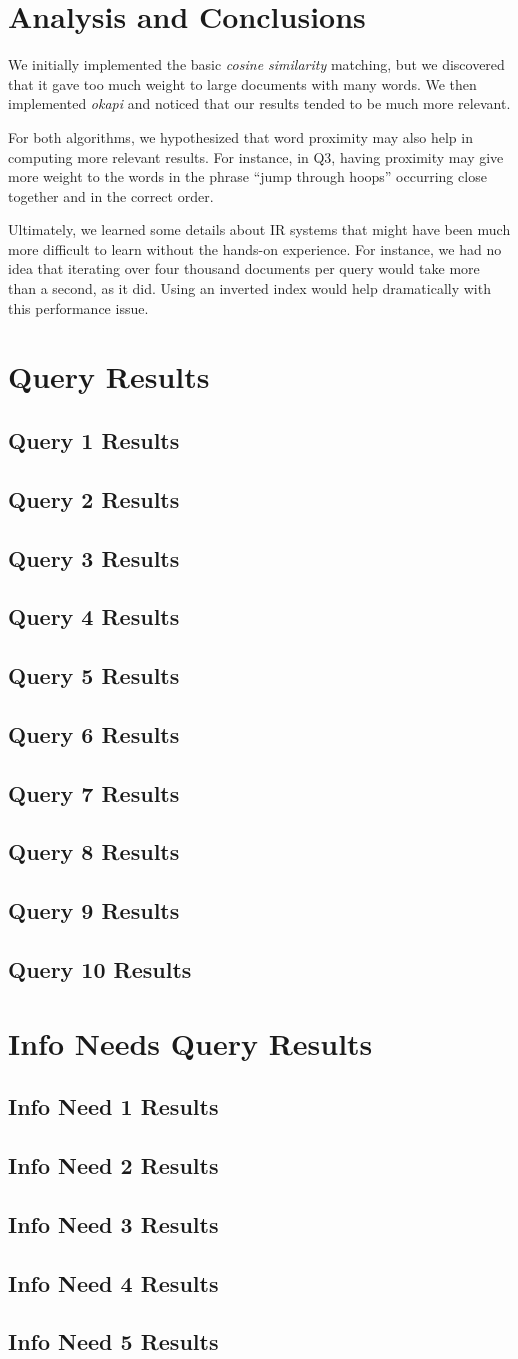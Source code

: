 \documentclass{report}
\newcommand{\results}[2]{\subsection{Query #1 Results}\begin{list}{}{}\end{list}}
\newcommand{\needresults}[2]{\subsection{Info Need #1 Results}\begin{list}{}{}\end{list}}
\newcommand{\okapi}{\textit{okapi} }
\newcommand{\cosine}{\textit{cosine similarity} }
\begin{document}
\section{Analysis and Conclusions}
We initially implemented the basic \cosine matching, but we discovered
that it gave too much weight to large documents with many words. We
then implemented \okapi and noticed that our results tended to be much
more relevant.

For both algorithms, we hypothesized that word proximity may also help
in computing more relevant results. For instance, in Q3, having
proximity may give more weight to the words in the phrase ``jump
through hoops'' occurring close together and in the correct order.

Ultimately, we learned some details about IR systems that might have
been much more difficult to learn without the hands-on experience. For
instance, we had no idea that iterating over four thousand documents
per query would take more than a second, as it did. Using an inverted
index would help dramatically with this performance issue.

\appendix
\section{Query Results}
\label{query-responses}
\results{1}{queryresults01.txt.tex}
\results{2}{queryresults02.txt.tex}
\results{3}{queryresults03.txt.tex}
\results{4}{queryresults04.txt.tex}
\results{5}{queryresults05.txt.tex}
\results{6}{queryresults06.txt.tex}
\results{7}{queryresults07.txt.tex}
\results{8}{queryresults08.txt.tex}
\results{9}{queryresults09.txt.tex}
\results{10}{queryresults10.txt.tex}
\section{Info Needs Query Results}
\label{need-responses}
\needresults{1}{InfoNeed01.txt.tex}
\needresults{2}{InfoNeed02.txt.tex}
\needresults{3}{InfoNeed03.txt.tex}
\needresults{4}{InfoNeed04.txt.tex}
\needresults{5}{InfoNeed05.txt.tex}
\end{document}
